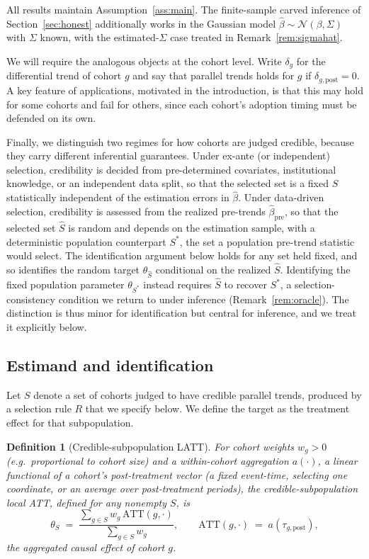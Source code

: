 \documentclass[12pt]{article}
\newtheorem{definition}{Definition}
\theoremstyle{remark}
\begin{document}
All results maintain Assumption~\ref{ass:main}. The finite-sample carved inference of
Section~\ref{sec:honest} additionally works in the Gaussian model $\hat\beta\sim\mathcal N(\beta,\Sigma)$
with $\Sigma$ known, with the estimated-$\Sigma$ case treated in Remark~\ref{rem:sigmahat}.

We will require the analogous objects at the cohort level. Write $\delta_g$ for the differential
trend of cohort $g$ and say that parallel trends holds for $g$ if $\delta_{g,\mathrm{post}}=0$.
A key feature of applications, motivated in the introduction, is that this may hold for some cohorts and
fail for others, since each cohort's adoption timing must be defended on its own.

Finally, we distinguish two regimes for how cohorts are judged credible, because they carry different
inferential guarantees. Under ex-ante (or independent) selection, credibility is decided from
pre-determined covariates, institutional knowledge, or an independent data split, so that the selected
set is a fixed $S$ statistically independent of the estimation errors in $\hat\beta$. Under data-driven
selection, credibility is assessed from the realized pre-trends $\hat\beta_{\mathrm{pre}}$, so that the
selected set $\hat S$ is random and depends on the estimation sample, with a deterministic population
counterpart $S^\ast$, the set a population pre-trend statistic would select. The identification argument
below holds for any set held fixed, and so identifies the random target $\theta_{\hat S}$ conditional on the
realized $\hat S$. Identifying the fixed population parameter $\theta_{S^\ast}$ instead requires $\hat S$ to
recover $S^\ast$, a selection-consistency condition we return to under inference
(Remark~\ref{rem:oracle}). The distinction is thus minor for identification but central for inference,
and we treat it explicitly below.

\subsection{Estimand and identification}

Let $S$ denote a set of cohorts judged to have credible parallel trends, produced by a selection rule
$R$ that we specify below. We define the target as the treatment effect for that subpopulation.

\begin{definition}[Credible-subpopulation LATT]
For cohort weights $w_g>0$ (e.g.\ proportional to cohort size) and a within-cohort aggregation $a(\cdot)$, a
linear functional of a cohort's post-treatment vector (a fixed event-time, selecting one coordinate, or an
average over post-treatment periods), the credible-subpopulation local ATT, defined for any nonempty $S$, is
\begin{equation}
\theta_S \;=\; \frac{\sum_{g\in S} w_g\,\mathrm{ATT}(g,\cdot)}{\sum_{g\in S} w_g},
\qquad \mathrm{ATT}(g,\cdot)\;=\;a\!\left(\tau_{g,\mathrm{post}}\right),
\end{equation}
the aggregated causal effect of cohort $g$.
\end{definition}
\end{document}
